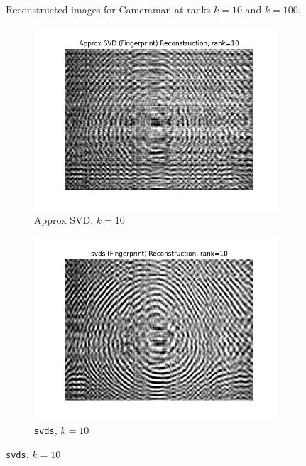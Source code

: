 \documentclass[11pt,a4paper, margin=1in]{article}
\begin{document}
\begin{enumerate}
\begin{figure}[H]
      \caption{Reconstructed images for Cameraman at ranks $k=10$ and $k=100$.}

    \end{figure}

    \begin{figure}[H]
      \centering
      \begin{subfigure}[b]{0.35\textwidth}
        \centering
        \includegraphics[width=\textwidth]{Approx SVD (Fingerprint)_reconstruction_rank_10.png}
        \caption{Approx SVD, $k=10$}
      \end{subfigure}
      \hfill
      \begin{subfigure}[b]{0.35\textwidth}
          \centering
          \includegraphics[width=\textwidth]{svds (Fingerprint)_reconstruction_rank_10.png}
          \caption{\texttt{svds}, $k=10$}
      \end{subfigure}
      

\end{figure}
\end{enumerate}
\end{document}
